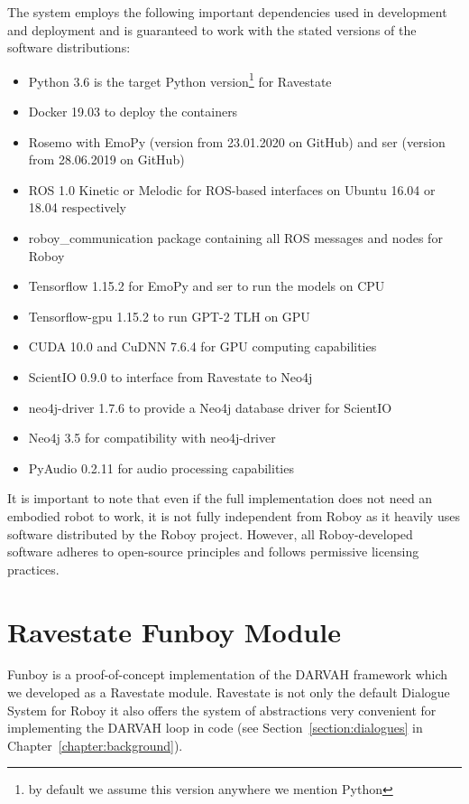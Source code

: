 The system employs the following important dependencies used in development and deployment and is guaranteed to work with the stated versions of the software distributions:
\begin{itemize}
    \item Python 3.6 is the target Python version\footnote{by default we assume this version anywhere we mention Python} for Ravestate
    \item Docker 19.03 to deploy the containers
    \item Rosemo with EmoPy (version from 23.01.2020 on GitHub) and \acrshort{ser} (version from 28.06.2019 on GitHub)
    \item ROS 1.0 Kinetic or Melodic for ROS-based interfaces on Ubuntu 16.04 or 18.04 respectively 
    \item roboy\_communication package containing all ROS messages and nodes for Roboy
    \item Tensorflow 1.15.2 for EmoPy and \acrshort{ser} to run the models on CPU
    \item Tensorflow-gpu 1.15.2 to run GPT-2 TLH on GPU
    \item CUDA 10.0 and CuDNN 7.6.4 for GPU computing capabilities
    \item ScientIO 0.9.0 to interface from Ravestate to Neo4j
    \item neo4j-driver 1.7.6 to provide a Neo4j database driver for ScientIO
    \item Neo4j 3.5 for compatibility with neo4j-driver
    \item PyAudio 0.2.11 for audio processing capabilities
\end{itemize}
It is important to note that even if the full implementation does not need an embodied robot to work, it is not fully independent from Roboy as it heavily uses software distributed by the Roboy project. However, all Roboy-developed software adheres to open-source principles and follows permissive licensing practices.

\section{Ravestate Funboy Module}

Funboy is a proof-of-concept implementation of the DARVAH framework which we developed as a Ravestate module. Ravestate is not only the default Dialogue System for Roboy it also offers the system of abstractions very convenient for implementing the DARVAH loop in code (see Section~\ref{section:dialogues} in Chapter~\ref{chapter:background}).


